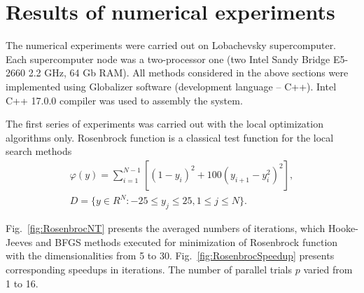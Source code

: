 \documentclass[runningheads]{llncs}
\begin{document}
\section{Results of numerical experiments}\label{sec:results}

The numerical experiments were carried out on Lobachevsky supercomputer. Each supercomputer node was a two-processor one (two Intel Sandy Bridge E5-2660 2.2 GHz, 64 Gb RAM). All methods considered in the above sections were implemented using Globalizer software \cite{globalizerSystem} (development language – C++). Intel C++ 17.0.0 compiler was used to assembly the system.

The first series of experiments was carried out with the local optimization algorithms only. Rosenbrock function is a classical test function for the local search methods 
\begin{gather}
    \varphi(y) = \sum_{i=1}^{N-1} \left[(1-y_i)^2 + 100(y_{i+1} - y_i^2)^2\right], \nonumber \\
    D = \{ y \in R^N: -25 \leq y_j \leq 25, 1 \leq j \leq N \}. \nonumber
\end{gather}

Fig.~\ref{fig:RosenbrocNT} presents the averaged numbers of iterations, which Hooke-Jeeves and BFGS methods executed for minimization of Rosenbrock function with the dimensionalities from 5 to 30. Fig.~\ref{fig:RosenbrocSpeedup} presents corresponding speedups in iterations. The number of parallel trials $p$ varied from 1 to 16.
\end{document}
